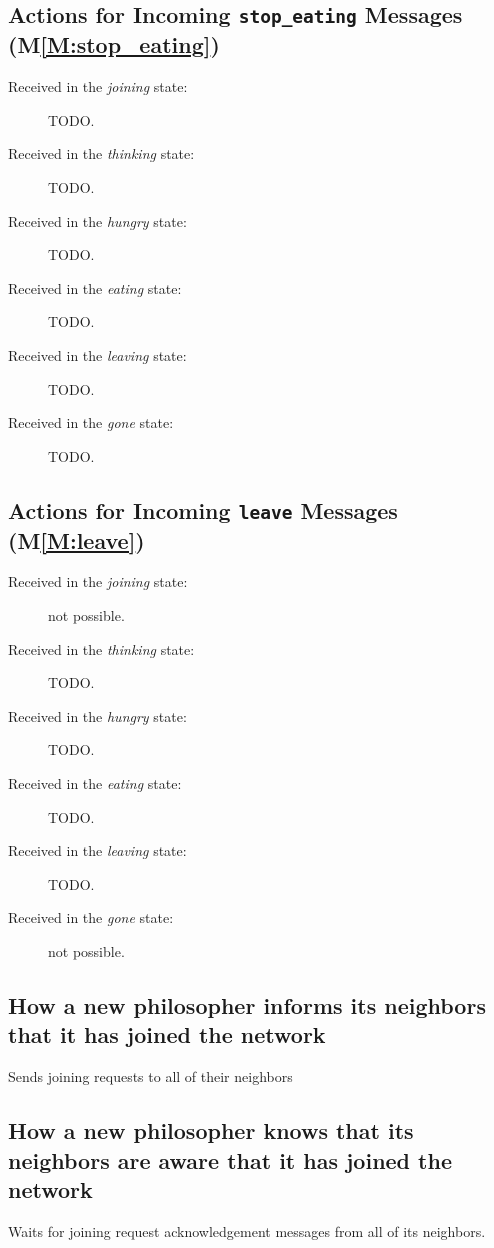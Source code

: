 \documentclass[11pt]{article}
\begin{document}
\subsection{Actions for Incoming \texttt{stop\_eating} Messages (M\ref{M:stop_eating})}
\begin{description}
\item[Received in the \textit{joining} state:] TODO.
\item[Received in the \textit{thinking} state:] TODO.
\item[Received in the \textit{hungry} state:] TODO.
\item[Received in the \textit{eating} state:] TODO.
\item[Received in the \textit{leaving} state:] TODO.
\item[Received in the \textit{gone} state:] TODO.
\end{description}

\subsection{Actions for Incoming \texttt{leave} Messages (M\ref{M:leave})}
\begin{description}
\item[Received in the \textit{joining} state:] not possible.
\item[Received in the \textit{thinking} state:] TODO.
\item[Received in the \textit{hungry} state:] TODO.
\item[Received in the \textit{eating} state:] TODO.
\item[Received in the \textit{leaving} state:] TODO.
\item[Received in the \textit{gone} state:] not possible.
\end{description}


\subsection{How a new philosopher informs its neighbors that it has joined the network}
Sends joining requests to all of their neighbors

\subsection{How a new philosopher knows that its neighbors are aware that it has joined the network}
Waits for joining request acknowledgement messages from all of its neighbors.
\end{document}
